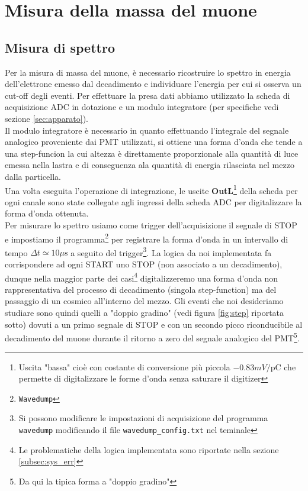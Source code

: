 \documentclass[10pt,a4paper]{article}
\begin{document}
\section{Misura della massa del muone}\label{sec:misura_massa}

\subsection{Misura di spettro}\label{sec:misura_spettro}
\begin{flushleft}
Per la misura di massa del muone, è necessario ricostruire lo spettro in energia dell'elettrone emesso dal decadimento e individuare l'energia per cui si osserva un cut-off degli eventi.
Per effettuare la presa dati abbiamo utilizzato la scheda di acquisizione ADC in dotazione e un modulo integratore (per specifiche vedi sezione \ref{sec:apparato}).\\
Il modulo integratore è necessario in quanto effettuando l'integrale del segnale analogico proveniente dai PMT utilizzati, si ottiene una forma d'onda che tende a una step-funcion la cui altezza è direttamente proporzionale alla quantità di luce emessa nella lastra e di conseguenza ala quantità di energia rilasciata nel mezzo dalla particella.\\
Una volta eseguita l'operazione di integrazione, le uscite \textbf{OutL}\footnote{Uscita "bassa" cioè con costante di conversione più piccola $-0.83 mV/\text{pC}$ che permette di digitalizzare le forme d'onda senza saturare il digitizer} della scheda per ogni canale sono state collegate agli ingressi della scheda ADC per digitalizzare la forma d'onda ottenuta.\\
Per misurare lo spettro usiamo come trigger dell'acquisizione il segnale di STOP e impostiamo il programma\footnote{\texttt{Wavedump}} per registrare la forma d'onda in un intervallo di tempo $\Delta t\simeq10\mu \text{s}$ a seguito del trigger\footnote{Si possono modificare le impostazioni di acquisizione del programma \texttt{wavedump} modificando il file \texttt{wavedump\_config.txt} nel teminale}. La logica da noi implementata fa corrispondere ad ogni START uno STOP (non associato a un decadimento), dunque nella maggior parte dei casi\footnote{Le problematiche della logica implementata sono riportate nella sezione \ref{subsec:sys_err}} digitalizzeremo una forma d'onda non rappresentativa del processo di decadimento (singola step-function) ma del passaggio di un cosmico all'interno del mezzo. Gli eventi che noi desideriamo studiare sono quindi quelli a "doppio gradino" (vedi figura \ref{fig:step} riportata sotto) dovuti a un primo segnale di STOP e con un secondo picco riconducibile al decadimento del muone durante il ritorno a zero del segnale analogico del PMT\footnote{Da qui la tipica forma a "doppio gradino"}.\\

\end{flushleft}
\end{document}
